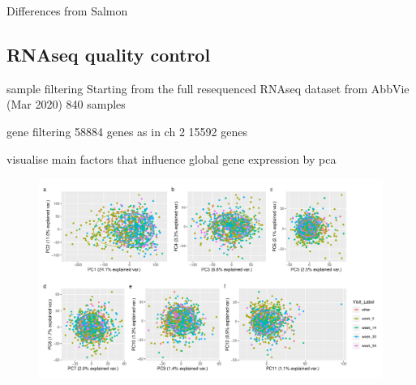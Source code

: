 \begin{outline}
%

Differences from Salmon

\subsection{RNAseq quality control}

sample filtering
Starting from the full resequenced RNAseq dataset from AbbVie (Mar 2020)
    840 samples

gene filtering
58884 genes
as in ch 2
15592 genes

visualise main factors that influence global gene expression by pca

\begin{figure}
    \centering
    \includegraphics[width=1.0\textwidth,page=1]{mainmatter/figures/chapter_04/dream.prcomp.pdf}
    \caption{}
    \label{fig:multipants_dream_prcomp}
\end{figure}


\end{outline}
